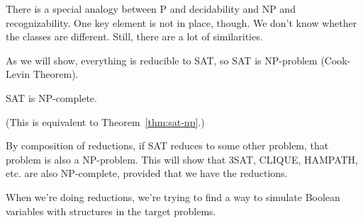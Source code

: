 
There is a special analogy between P and decidability and NP and recognizability. 
One key element is not in place, though. We don't know whether the classes are different. Still, there are a lot of similarities.

As we will show, everything is reducible to SAT, so SAT is NP-problem (Cook-Levin Theorem).
\begin{thm}
SAT is NP-complete.
\end{thm}
(This is equivalent to Theorem~\ref{thm:sat-np}.)

By composition of reductions, if SAT reduces to some other problem, that problem is also a NP-problem. This will show that 3SAT, CLIQUE, HAMPATH, etc. are also NP-complete, provided that we have the reductions.

\vskip0.15in
When we're doing reductions, we're trying to find a way to simulate Boolean variables with structures in the target problems.\\

